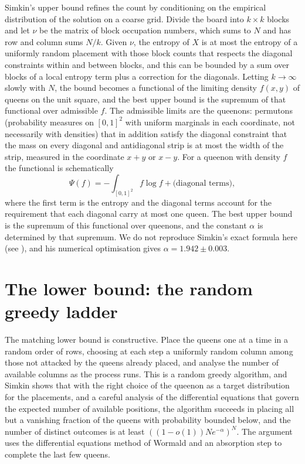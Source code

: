 Simkin's upper bound refines the count by conditioning on the empirical distribution of the solution on a coarse grid. Divide the board into $k \times k$ blocks and let $\nu$ be the matrix of block occupation numbers, which sums to $N$ and has row and column sums $N/k$. Given $\nu$, the entropy of $X$ is at most the entropy of a uniformly random placement with those block counts that respects the diagonal constraints within and between blocks, and this can be bounded by a sum over blocks of a local entropy term plus a correction for the diagonals. Letting $k \to \infty$ slowly with $N$, the bound becomes a functional of the limiting density $f(x, y)$ of queens on the unit square, and the best upper bound is the supremum of that functional over admissible $f$. The admissible limits are the queenons: permutons (probability measures on $[0,1]^2$ with uniform marginals in each coordinate, not necessarily with densities) that in addition satisfy the diagonal constraint that the mass on every diagonal and antidiagonal strip is at most the width of the strip, measured in the coordinate $x + y$ or $x - y$. For a queenon with density $f$ the functional is schematically
\[
\Psi(f) = -\int_{[0,1]^2} f \log f + \text{(diagonal terms)} ,
\]
where the first term is the entropy and the diagonal terms account for the requirement that each diagonal carry at most one queen. The best upper bound is the supremum of this functional over queenons, and the constant $\alpha$ is determined by that supremum. We do not reproduce Simkin's exact formula here (see \cite{Simkin}), and his numerical optimisation gives $\alpha = 1.942 \pm 0.003$.

\section{The lower bound: the random greedy ladder}

The matching lower bound is constructive. Place the queens one at a time in a random order of rows, choosing at each step a uniformly random column among those not attacked by the queens already placed, and analyse the number of available columns as the process runs. This is a random greedy algorithm, and Simkin shows that with the right choice of the queenon as a target distribution for the placements, and a careful analysis of the differential equations that govern the expected number of available positions, the algorithm succeeds in placing all but a vanishing fraction of the queens with probability bounded below, and the number of distinct outcomes is at least $((1 - o(1)) N e^{-\alpha})^N$. The argument uses the differential equations method of Wormald and an absorption step to complete the last few queens.

